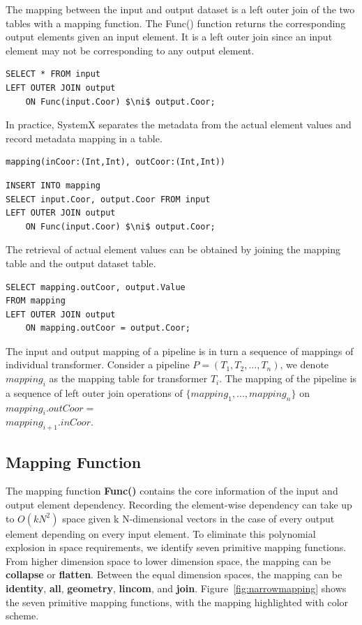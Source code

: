\documentclass{sig-alternate}
\begin{document}
The mapping between the input and output dataset is a left outer join of the two tables with a mapping function.
The Func() function returns the corresponding output elements given an input element. 
It is a left outer join since an input element may not be corresponding to any output element.
\begin{lstlisting}
SELECT * FROM input
LEFT OUTER JOIN output 
    ON Func(input.Coor) $\ni$ output.Coor;
\end{lstlisting}

In practice, SystemX separates the metadata from the actual element values and record metadata mapping
in a table.
\begin{lstlisting}
mapping(inCoor:(Int,Int), outCoor:(Int,Int))
\end{lstlisting}

\begin{lstlisting}
INSERT INTO mapping
SELECT input.Coor, output.Coor FROM input
LEFT OUTER JOIN output 
    ON Func(input.Coor) $\ni$ output.Coor;
\end{lstlisting}

The retrieval of actual element values can be obtained by joining the mapping table and the output dataset table.
\begin{lstlisting}
SELECT mapping.outCoor, output.Value
FROM mapping
LEFT OUTER JOIN output 
    ON mapping.outCoor = output.Coor;
\end{lstlisting}

The input and output mapping of a pipeline is in turn a sequence of mappings of individual transformer.
Consider a pipeline $P=(T_1, T_2, ..., T_n)$, we denote $mapping_i$ as the mapping table for transformer $T_i$.
The mapping of the pipeline is a sequence of left outer join operations of $\{mapping_1, ..., mapping_n\}$ 
on $mapping_i.outCoor = $\\$mapping_{i+1}.inCoor$.

\subsection{Mapping Function}
\label{sec:Map-Func}
The mapping function {\bf Func()} contains the core information of the input and output element dependency.
Recording the element-wise dependency can take up to $O(kN^2)$ space given k N-dimensional vectors in the case
of every output element depending on every input element. 
To eliminate this polynomial explosion in space requirements, we identify seven primitive mapping functions.
From higher dimension space to lower dimension space, the mapping can be {\bf collapse} or {\bf flatten}.
Between the equal dimension spaces, the mapping can be {\bf identity}, {\bf all}, {\bf geometry}, {\bf lincom}, and {\bf join}.
Figure~\ref{fig:narrowmapping} shows the seven primitive mapping functions, with the mapping highlighted with color scheme.
\end{document}
